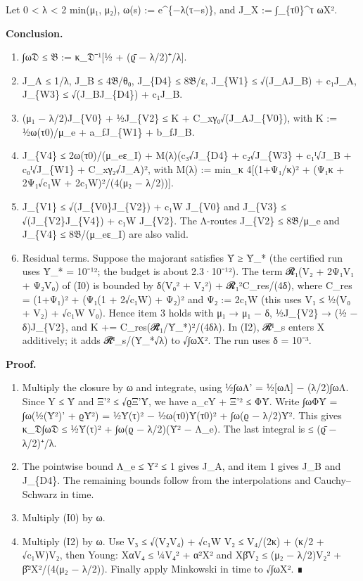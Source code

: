 \documentclass[
]{article}
\providecommand{\tightlist}{%
  \setlength{\itemsep}{0pt}\setlength{\parskip}{0pt}}
\begin{document}
Let 0 \textless{} λ \textless{} 2 min(μ₁, μ₂), ω(s) := e\^{}\{−λ(τ−s)\},
and J\_X := ∫\_\{τ0\}\^{}τ ωX².

\textbf{Conclusion.}

\begin{enumerate}
\def\labelenumi{\arabic{enumi}.}
\tightlist
\item
  ∫ω𝔇 ≤ 𝔅 := κ\_𝔇⁻¹{[}½ + (ϱ̄ − λ/2)⁺/λ{]}.
\item
  J\_A ≤ 1/λ, J\_B ≤ 4𝔅/θ₀, J\_\{D4\} ≤ 8𝔅/ε, J\_\{W1\} ≤ √(J\_AJ\_B) +
  c₁J\_A, J\_\{W3\} ≤ √(J\_BJ\_\{D4\}) + c₁J\_B.
\item
  (μ₁ − λ/2)J\_\{V0\} + ½J\_\{V2\} ≤ K + C\_xγ₀√(J\_AJ\_\{V0\}), with K
  := ½ω(τ0)/μ\_e + a\_fJ\_\{W1\} + b\_fJ\_B.
\item
  J\_\{V4\} ≤ 2ω(τ0)/(μ\_eε\_I) + M(λ)(c₃√J\_\{D4\} + c₂√J\_\{W3\} +
  c₁ᴵ√J\_B + c₀ᴵ√J\_\{W1\} + C\_xγ₂√J\_A)², with M(λ) := min\_κ
  4{[}(1+Ψ₁/κ)² + (Ψ₁κ + 2Ψ₁√c₁W + 2c₁W)²/(4(μ₂ − λ/2)){]}.
\item
  J\_\{V1\} ≤ √(J\_\{V0\}J\_\{V2\}) + c₁W J\_\{V0\} and J\_\{V3\} ≤
  √(J\_\{V2\}J\_\{V4\}) + c₁W J\_\{V2\}. The Λ-routes J\_\{V2\} ≤
  8𝔅/μ\_e and J\_\{V4\} ≤ 8𝔅/(μ\_eε\_I) are also valid.
\item
  Residual terms. Suppose the majorant satisfies Ȳ ≥ Ȳ\_* (the certified
  run uses Ȳ\_* = 10⁻¹²; the budget is about 2.3·10⁻¹²). The term 𝓡₁(V₂
  + 2Ψ₁V₁ + Ψ₂V₀) of (I0) is bounded by δ(V₀² + V₂²) + 𝓡₁²C\_res/(4δ),
  where C\_res = (1+Ψ₁)² + (Ψ₁(1 + 2√c₁W) + Ψ₂)² and Ψ₂ := 2c₁W (this
  uses V₁ ≤ ½(V₀ + V₂) + √c₁W V₀). Hence item 3 holds with μ₁ → μ₁ − δ,
  ½J\_\{V2\} → (½ − δ)J\_\{V2\}, and K += C\_res(𝓡̄₁/Ȳ\_*)²/(4δλ). In
  (I2), 𝓡ᴵ\_s enters X additively; it adds 𝓡̄ᴵ\_s/(Ȳ\_*√λ) to √∫ωX². The
  run uses δ = 10⁻³.
\end{enumerate}

\textbf{Proof.}

\begin{enumerate}
\def\labelenumi{\arabic{enumi}.}
\tightlist
\item
  Multiply the closure by ω and integrate, using ½∫ωΛ' = ½{[}ωΛ{]} −
  (λ/2)∫ωΛ. Since Y ≤ Ȳ and Ξ'² ≤ √ϱΞ'Ȳ, we have a\_cY + Ξ'² ≤ ΦȲ. Write
  ∫ωΦȲ = ∫ω(½(Ȳ²)' + ϱȲ²) = ½Ȳ(τ)² − ½ω(τ0)Ȳ(τ0)² + ∫ω(ϱ − λ/2)Ȳ². This
  gives κ\_𝔇∫ω𝔇 ≤ ½Ȳ(τ)² + ∫ω(ϱ − λ/2)(Ȳ² − Λ\_e). The last integral is
  ≤ (ϱ̄ − λ/2)⁺/λ.
\item
  The pointwise bound Λ\_e ≤ Ȳ² ≤ 1 gives J\_A, and item 1 gives J\_B
  and J\_\{D4\}. The remaining bounds follow from the interpolations and
  Cauchy--Schwarz in time.
\item
  Multiply (I0) by ω.
\item
  Multiply (I2) by ω. Use V₃ ≤ √(V₂V₄) + √c₁W V₂ ≤ V₄/(2κ) + (κ/2 +
  √c₁W)V₂, then Young: XαV₄ ≤ ¼V₄² + α²X² and Xβ̂V₂ ≤ (μ₂ − λ/2)V₂² +
  β̂²X²/(4(μ₂ − λ/2)). Finally apply Minkowski in time to √∫ωX². ∎
\end{enumerate}
\end{document}
